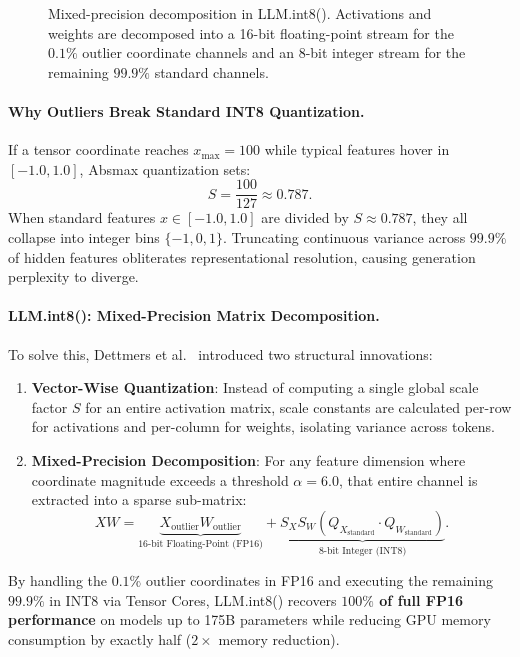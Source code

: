 \documentclass[../../../main.tex]{subfiles}
\begin{document}
\begin{figure}[htbp]
\caption{Mixed-precision decomposition in LLM.int8(). Activations and weights are decomposed into a 16-bit floating-point stream for the $0.1\%$ outlier coordinate channels and an 8-bit integer stream for the remaining $99.9\%$ standard channels.}
\label{fig:llm_int8_decomposition}
\end{figure}

\paragraph{Why Outliers Break Standard INT8 Quantization.}
If a tensor coordinate reaches $x_{\max} = 100$ while typical features hover in $[-1.0, 1.0]$, Absmax quantization sets:
\begin{equation}
S = \frac{100}{127} \approx 0.787.
\end{equation}
When standard features $x \in [-1.0, 1.0]$ are divided by $S \approx 0.787$, they all collapse into integer bins $\{-1, 0, 1\}$. Truncating continuous variance across $99.9\%$ of hidden features obliterates representational resolution, causing generation perplexity to diverge.

\paragraph{LLM.int8(): Mixed-Precision Matrix Decomposition.}
To solve this, Dettmers et al.~\citep{dettmers2022llmint8} introduced two structural innovations:
\begin{enumerate}
    \item \textbf{Vector-Wise Quantization}: Instead of computing a single global scale factor $S$ for an entire activation matrix, scale constants are calculated per-row for activations and per-column for weights, isolating variance across tokens.
    \item \textbf{Mixed-Precision Decomposition}: For any feature dimension where coordinate magnitude exceeds a threshold $\alpha = 6.0$, that entire channel is extracted into a sparse sub-matrix:
    \begin{equation}
    \label{eq:llm_int8_decomp}
    X W = \underbrace{X_{\text{outlier}} W_{\text{outlier}}}_{\text{16-bit Floating-Point (FP16)}} + \underbrace{S_X S_W \left(Q_{X_{\text{standard}}} \cdot Q_{W_{\text{standard}}}\right)}_{\text{8-bit Integer (INT8)}}.
    \end{equation}
\end{enumerate}
By handling the $0.1\%$ outlier coordinates in FP16 and executing the remaining $99.9\%$ in INT8 via Tensor Cores, LLM.int8() recovers \textbf{$100\%$ of full FP16 performance} on models up to 175B parameters while reducing GPU memory consumption by exactly half ($2\times$ memory reduction).
\end{document}
